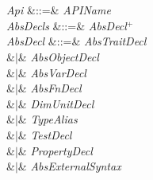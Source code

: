 %
%
%
%

\section{\Apis}


\begin{Grammar}
\emph{Api} &::=&
 \emph{APIName}   
\\

\emph{AbsDecls} &::=& \emph{AbsDecl}$^+$\\

\emph{AbsDecl} &::=& \emph{AbsTraitDecl}\\
&$|$& \emph{AbsObjectDecl}\\
&$|$& \emph{AbsVarDecl}\\
&$|$& \emph{AbsFnDecl}\\
&$|$& \emph{DimUnitDecl}\\
&$|$& \emph{TypeAlias}\\
&$|$& \emph{TestDecl}\\
&$|$& \emph{PropertyDecl}\\
&$|$& \emph{AbsExternalSyntax}\\

\end{Grammar}

